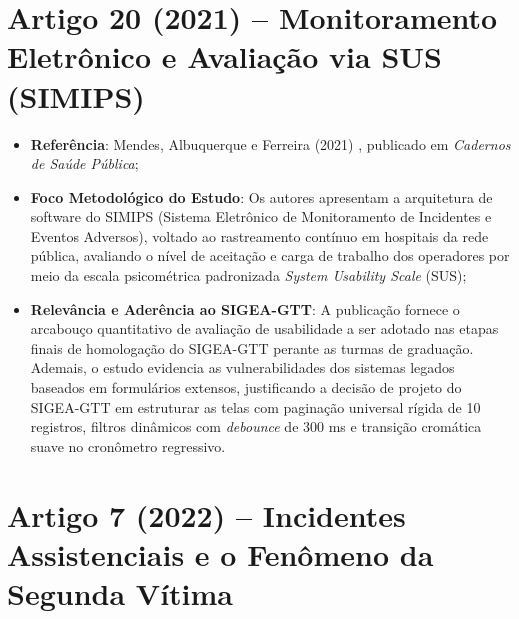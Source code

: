 \section{Artigo 20 (2021) -- Monitoramento Eletrônico e Avaliação via SUS (SIMIPS)}
\label{sec_artigo_simips}

\begin{itemize}
    \item \textbf{Referência}: Mendes, Albuquerque e Ferreira (2021) \cite{artigo_simips2021}, publicado em \textit{Cadernos de Saúde Pública};
    \item \textbf{Foco Metodológico do Estudo}: Os autores apresentam a arquitetura de software do SIMIPS (Sistema Eletrônico de Monitoramento de Incidentes e Eventos Adversos), voltado ao rastreamento contínuo em hospitais da rede pública, avaliando o nível de aceitação e carga de trabalho dos operadores por meio da escala psicométrica padronizada \textit{System Usability Scale} (SUS);
    \item \textbf{Relevância e Aderência ao SIGEA-GTT}: A publicação fornece o arcabouço quantitativo de avaliação de usabilidade a ser adotado nas etapas finais de homologação do SIGEA-GTT perante as turmas de graduação. Ademais, o estudo evidencia as vulnerabilidades dos sistemas legados baseados em formulários extensos, justificando a decisão de projeto do SIGEA-GTT em estruturar as telas com paginação universal rígida de 10 registros, filtros dinâmicos com \textit{debounce} de 300 ms e transição cromática suave no cronômetro regressivo.
\end{itemize}

\section{Artigo 7 (2022) -- Incidentes Assistenciais e o Fenômeno da Segunda Vítima}
\label{sec_artigo_segundavitima}

